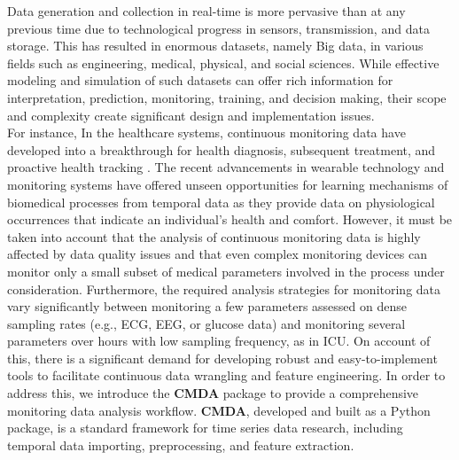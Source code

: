 Data generation and collection in real-time is more pervasive than at any previous time due to technological progress in sensors, transmission, and data storage. This has resulted in enormous datasets, namely Big data, in various fields such as engineering, medical, physical, and social sciences. While effective modeling and simulation of such datasets can offer rich information for interpretation, prediction, monitoring, training, and decision making, their scope and complexity create significant design and implementation issues.\\
For instance, In the healthcare systems, continuous monitoring data have developed into a breakthrough for health diagnosis, subsequent treatment, and proactive health tracking \cite{athavale_biosignal_2017}. The recent advancements in wearable technology and monitoring systems have offered unseen opportunities for learning mechanisms of biomedical processes from temporal data as they provide data on physiological occurrences that indicate an individual’s health and comfort. 
However, it must be taken into account that the analysis of continuous monitoring data is highly affected by data quality issues and that even complex monitoring devices can monitor only a small subset of medical parameters involved in the process under consideration. Furthermore, the required analysis strategies for monitoring data vary significantly between monitoring a few parameters assessed on dense sampling rates (e.g., ECG, EEG, or glucose data) and monitoring several parameters over hours with low sampling frequency, as in ICU. 
On account of this, there is a significant demand for developing robust and easy-to-implement tools to facilitate continuous data wrangling and feature engineering.
In order to address this, we introduce the \textbf{CMDA} package to provide a comprehensive monitoring data analysis workflow.
\textbf{CMDA}, developed and built as a Python package, is a standard framework for time series data research, including temporal data importing, preprocessing, and feature extraction.